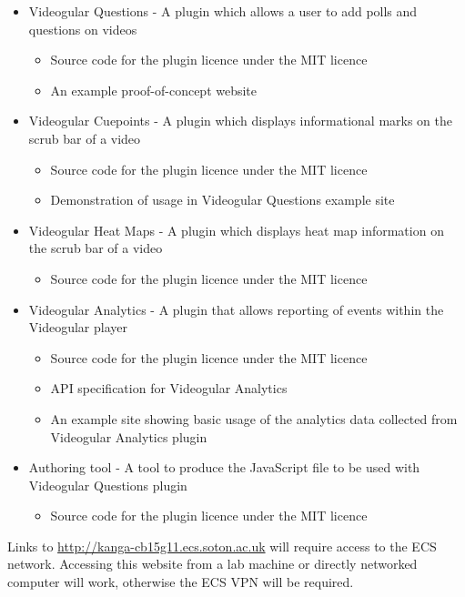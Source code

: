 \documentclass[12pt,a4paper]{article}
\begin{document}
\begin{itemize}
\item Videogular Questions - A plugin which allows a user to add polls and questions on videos
	\begin{itemize}
	\item Source code for the plugin licence under the MIT licence
	\item An example proof-of-concept website
	\end{itemize}
	
\item Videogular Cuepoints - A plugin which displays informational marks on the scrub bar of a video
	\begin{itemize}
	\item Source code for the plugin licence under the MIT licence
	\item Demonstration of usage in Videogular Questions example site
	\end{itemize}
	
\item Videogular Heat Maps - A plugin which displays heat map information on the scrub bar of a video
	\begin{itemize}
	\item Source code for the plugin licence under the MIT licence
	\end{itemize}
	
\item Videogular Analytics - A plugin that allows reporting of events within the Videogular player
	\begin{itemize}
	\item Source code for the plugin licence under the MIT licence
	\item API specification for Videogular Analytics
	\item An example site showing basic usage of the analytics data collected from Videogular Analytics plugin
	\end{itemize}
	
\item Authoring tool - A tool to produce the JavaScript file to be used with Videogular Questions plugin
	\begin{itemize}
	\item Source code for the plugin licence under the MIT licence
	\end{itemize}
\end{itemize}

Links to \url{http://kanga-cb15g11.ecs.soton.ac.uk} will require access to the ECS network. Accessing this website from a lab machine or directly networked computer will work, otherwise the ECS VPN will be required.
\end{document}
